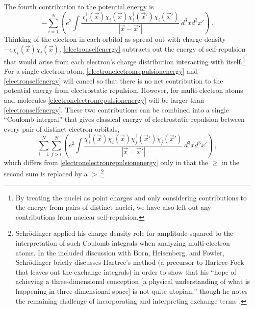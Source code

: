 \documentclass[onecolumn,secnumarabic,amsmath,amssymb,balancelastpage,nofootinbib]{article}
\begin{document}
The fourth contribution to the potential energy is
\begin{equation}
-\sum_{i=1}^{N}\left(e^2\int{\frac{\chi_i^{\dagger}(\vec{x})\chi_i(\vec{x})\chi_i^{\dagger}(\vec{x}')\chi_i(\vec{x}')}{|\vec{x}-\vec{x}'|}\  d^3 x d^3 x'}\right)
\ .
\label{electronselfenergy}
\end{equation}
Thinking of the electron in each orbital as spread out with charge density $-e\chi_i^{\dagger}(\vec{x})\chi_i(\vec{x})$, \eqref{electronselfenergy} subtracts out the energy of self-repulsion that would arise from each electron's charge distribution interacting with itself.\footnote{By treating the nuclei as point charges and only considering contributions to the energy from pairs of distinct nuclei, we have also left out any contributions from nuclear self-repulsion.}  For a single-electron atom,  \eqref{electronelectronrepulsionenergy} and \eqref{electronselfenergy} will cancel so that there is no net contribution to the potential energy from electrostatic repulsion.  However, for multi-electron atoms and molecules \eqref{electronelectronrepulsionenergy} will be larger than \eqref{electronselfenergy}.  These two contributions can be combined into a single ``Coulomb integral'' that gives classical energy of electrostatic repulsion between every pair of distinct electron orbitals,
\begin{equation}
\sum_{i=1}^{N}\sum_{j > i}^{N}\left(e^2\int{\frac{\chi_i^{\dagger}(\vec{x})\chi_i(\vec{x})\chi_j^{\dagger}(\vec{x}')\chi_j(\vec{x}')}{|\vec{x}-\vec{x}'|}\  d^3 x d^3 x'}\right)
\ ,
\label{coulombintegral}
\end{equation}
which differs from \eqref{electronelectronrepulsionenergy} only in that the $\geq$ in the second sum is replaced by a $>$.\footnote{Schr\"{o}dinger \cite[sec.\ 3]{schrodinger1928report} applied his charge density role for amplitude-squared to the interpretation of such Coulomb integrals when analyzing multi-electron atoms.  In the included discussion with Born, Heisenberg, and Fowler, Schr\"{o}dinger briefly discusses Hartree's method (a precursor to Hartree-Fock that leaves out the exchange integrals) in order to show that his ``hope of achieving a three-dimensional conception [a physical understanding of what is happening in three-dimensional space] is not quite utopian,'' though he notes the remaining challenge of incorporating and interpreting exchange terms \cite[pg.\ 428--429]{bacciagaluppi2009}.}
\end{document}

